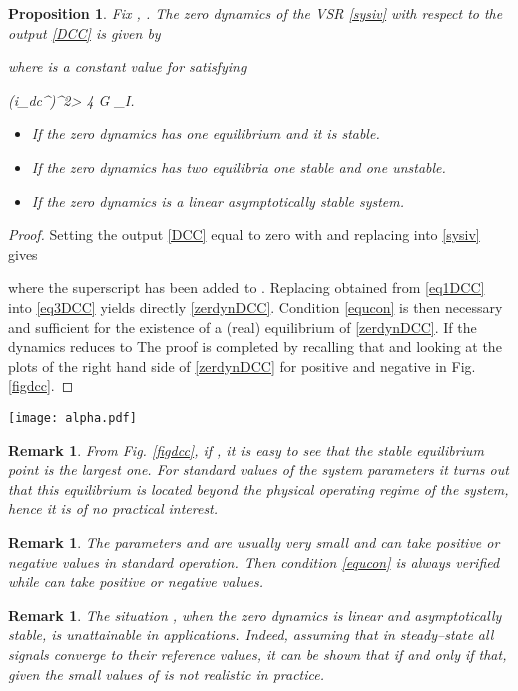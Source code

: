 \documentclass[5p,twocolumn]{elsarticle}
\def\begequ{}
\def\lab{\label}
\def\begite{\begin{itemize}}
\def\endite{\end{itemize}}
\def\begrem{\begin{remark}\rm}
\def\endrem{\end{remark}}
\newtheorem{proposition}[theorem]{Proposition}
\newtheorem{remark}[theorem]{Remark}
\numberwithin{equation}{section}
\begin{document}
\begin{proposition}\em
\label{zeroprop1}
Fix , . The zero dynamics of the VSR \eqref{sysiv} with respect to the output \eqref{DCC} is given by

where  is a constant value for  satisfying
\begequ
\lab{equcon}
(i_{dc}^{})^2> 4 G \alpha_I.
\endequ
\begite
\item[-] If  the zero dynamics has one equilibrium and it is {\em stable}.
\item[-] If  the zero dynamics has two equilibria one stable and one {unstable}.
\item[-] If  the zero dynamics is a linear asymptotically {\em stable} system.
\endite
\end{proposition}
\begin{proof}
Setting the output \eqref{DCC} equal to zero with  and replacing into \eqref{sysiv} gives

where the superscript  has been added to . Replacing  obtained from \eqref{eq1DCC} into \eqref{eq3DCC} yields directly \eqref{zerdynDCC}. Condition \eqref{equcon} is then
necessary and sufficient for the existence of a (real) equilibrium of \eqref{zerdynDCC}. If  the dynamics reduces to  The proof is completed by recalling that  and looking at
the plots of  the right hand side of \eqref{zerdynDCC} for  positive and negative in Fig. \ref{figdcc}.
\end{proof}
\begin{figure*}[ht]
 \centering
\texttt{[image: alpha.pdf]}
 \caption{Plot of  versus  for the cases of (a)  and (b) . The arrows in the horizontal axis indicate the direction of the flow of the zero dynamics.}
 \label{figdcc}
\end{figure*}

\begrem
From Fig. \ref{figdcc}, if , it is easy to see that the stable equilibrium point is the largest one. For standard values of the system parameters it turns out that this equilibrium is located beyond the physical operating regime of the system, hence it is of no practical interest.
\endrem

\begrem
\lab{rem5.6}
The parameters  and  are usually very small and  can take positive or negative values in standard operation. Then condition \eqref{equcon} is always verified while  can take positive or negative values.
\endrem

\begrem
\lab{rem5.7}
The situation , when the zero dynamics is linear and asymptotically stable, is unattainable in applications. Indeed, assuming that in steady--state all signals converge to their reference values, it can be shown that  if and only if  that, given the small values of  is not realistic in practice.
\endrem
\end{document}
